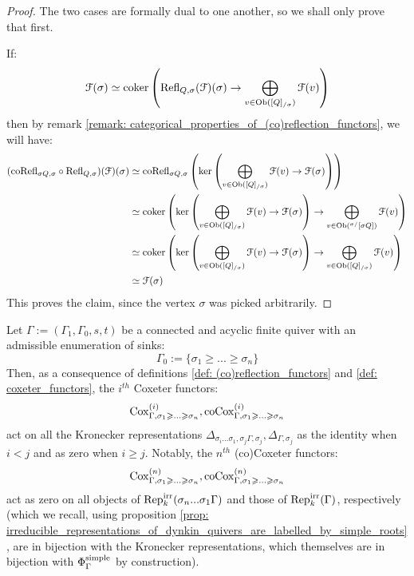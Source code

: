                 \begin{proof}
                    The two cases are formally dual to one another, so we shall only prove that first.
                    
                    If:
                        $$\mathcal{F}(\sigma) \simeq \operatorname{coker} \left( \mathrm{Refl}_{Q, \sigma}(\mathcal{F})(\sigma) \to \bigoplus_{v \in \mathrm{Ob}([Q]_{/\sigma})} \mathcal{F}(v) \right)$$
                    then by remark \ref{remark: categorical_properties_of_(co)reflection_functors}, we will have:
                        $$
                            \begin{aligned}
                                (\mathrm{co}\mathrm{Refl}_{\sigma Q, \sigma} \circ \mathrm{Refl}_{Q, \sigma})(\mathcal{F})(\sigma) & \simeq \mathrm{co}\mathrm{Refl}_{\sigma Q, \sigma}\left( \ker \left( \bigoplus_{v \in \mathrm{Ob}([Q]_{/\sigma})} \mathcal{F}(v) \to \mathcal{F}(\sigma) \right) \right)
                                \\
                                & \simeq \operatorname{coker} \left( \ker \left( \bigoplus_{v \in \mathrm{Ob}([Q]_{/\sigma})} \mathcal{F}(v) \to \mathcal{F}(\sigma) \right) \to \bigoplus_{v \in \mathrm{Ob}({}^{\sigma/}[\sigma Q])} \mathcal{F}(v) \right)
                                \\
                                & \simeq \operatorname{coker} \left( \ker \left( \bigoplus_{v \in \mathrm{Ob}([Q]_{/\sigma})} \mathcal{F}(v) \to \mathcal{F}(\sigma) \right) \to \bigoplus_{v \in \mathrm{Ob}([Q]_{/\sigma})} \mathcal{F}(v) \right)
                                \\
                                & \simeq \mathcal{F}(\sigma)
                            \end{aligned}
                        $$
                    This proves the claim, since the vertex $\sigma$ was picked arbitrarily. 
                \end{proof}
            \begin{remark} \label{remark: coxeter_functors_act_as_zero_on_irreducible_representations}
                Let $\Gamma := (\Gamma_1, \Gamma_0, s, t)$ be a connected and acyclic finite quiver with an admissible enumeration of sinks:
                    $$\Gamma_0 := \{\sigma_1 \geq ... \geq \sigma_n\}$$
                Then, as a consequence of definitions \ref{def: (co)reflection_functors} and \ref{def: coxeter_functors}, the $i^{th}$ Coxeter functors:
                    $$\mathrm{Cox}_{\Gamma, \sigma_1 \geqslant ...\geqslant \sigma_n}^{(i)}, \mathrm{co}\mathrm{Cox}_{\Gamma, \sigma_1 \geqslant ...\geqslant \sigma_n}^{(i)}$$
                act on all the Kronecker representations $\Delta_{\sigma_i ... \sigma_1, \sigma_j \Gamma, \sigma_j}, \Delta_{\Gamma, \sigma_j}$ as the identity when $i < j$ and as zero when $i \geq j$. Notably, the $n^{th}$ (co)Coxeter functors:
                    $$\mathrm{Cox}_{\Gamma, \sigma_1 \geqslant ...\geqslant \sigma_n}^{(n)}, \mathrm{co}\mathrm{Cox}_{\Gamma, \sigma_1 \geqslant ...\geqslant \sigma_n}^{(n)}$$
                act as zero on all objects of $\mathrm{Rep}_k^{\mathrm{irr}}(\sigma_n ... \sigma_1 \Gamma)$ and those of $\mathrm{Rep}_k^{\mathrm{irr}}(\Gamma)$, respectively (which we recall, using proposition \ref{prop: irreducible_representations_of_dynkin_quivers_are_labelled_by_simple_roots}, are in bijection with the Kronecker representations, which themselves are in bijection with $\Phi_{\Gamma}^{\mathrm{simple}}$ by construction). 
            \end{remark}
